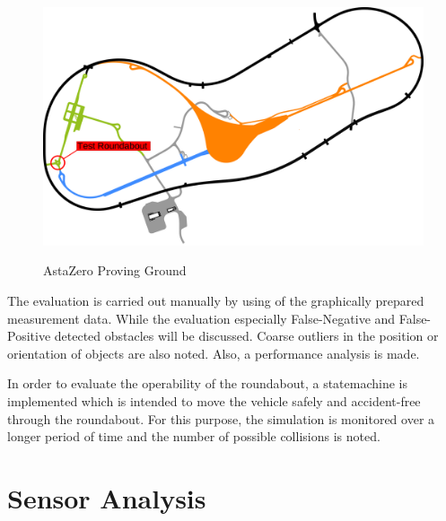 \documentclass[11pt,oneside,openright]{mpreport}
\begin{document}
\begin{figure}[!ht]
\caption{AstaZero Proving Ground}
\includegraphics[width=\textwidth]{bilder/AstaZero.pdf}
\label{astazero}
\end{figure}


The evaluation is carried out manually by using of the graphically prepared measurement data. 
While the evaluation especially False-Negative and False-Positive detected obstacles will be discussed.
Coarse outliers in the position or orientation of objects are also noted. Also, a performance analysis is made.


In order to evaluate the operability of the roundabout, a statemachine is implemented which is intended to move the vehicle safely and accident-free through the roundabout.
For this purpose, the simulation is monitored over a longer period of time and the number of possible collisions is noted.


\chapter{Sensor Analysis}
\end{document}
